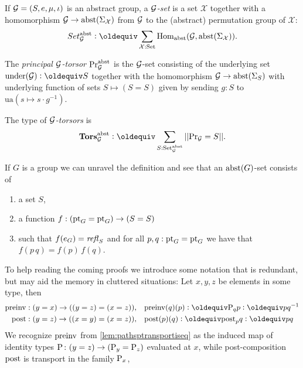 \begin{definition}
\label{def:abstrGtorsors}
  If ${\mathcal G}=(S,e,\mu,\iota)$ is an abstract group, a \emph{$\mathcal G$-set} is a set $\mathcal X$ together with a homomorphism
$\mathcal G\to\mathrm{abst}(\Sigma_{\mathcal X})$
from $\mathcal G$ to the (abstract) permutation group of $\mathcal X$:
$$Set_{\agp G}^\abstr\defequi \sum_{\mathcal X:\Set}\Hom_\abstr({\agp G},\abstr(\Sigma_{\mathcal X})).$$

The \emph{principal ${\mathcal G}$-torsor} $\mathrm{Pr}_{{\mathcal G}}^{\mathrm{abst}}$ is the ${\mathcal G}$-set consisting of the underlying set $\mathrm{under}({\agp G})\defequi S$ together with the homomorphism ${\mathcal G}\to\mathrm{abst}(\Sigma_{S})$ with underlying function of sets $S\mapsto (S=S)$ given by sending $g:S$ to $\mathrm{ua}(s\mapsto s\cdot g^{-1})$.

The type of \emph{${\mathcal G}$-torsors} is
$$\typetorsor_{\agp G}^\abstr\defequi\sum_{S:\Set_{\agp G}^\abstr}||\princ {\agp G}=S||.$$
\end{definition}
\begin{example}
  If $G$ is a group we can unravel the definition and see that an $\mathrm{abst}(G)$-set consists of
  \begin{enumerate}
  \item a set $S$, 
  \item a function $f:({\mathord{\mathrm{pt}}}_G={\mathord{\mathrm{pt}}}_G)\to (S=S)$ 
  \item such that $f(e_G)=\mathop{{\it refl}_{S}}$ and for all $p,q:{\mathord{\mathrm{pt}}}_G={\mathord{\mathrm{pt}}}_G$ we have that $f(p\, q)=f(p)\,f(q)$.
  \end{enumerate}

\end{example}


To help reading the coming proofs we introduce some notation that is redundant, but may aid the memory in cluttered situations:  Let $x,y,z$ be elements in some type, then
\begin{align*}
  \preinv:(y=x)\to ((y=z)=(x=z)),\quad&\preinv(q)(p)\defequi\pathsp qp\defequi pq^{-1}\\
  \post:(y=z)\to ((x=y)=(x=z)),\quad&\post(p)(q)\defequi\post_pq\defequi pq\\
\end{align*}
We recognize $\mathrm{preinv}$ from \cref{lem:pathsptransportiseq} as the induced map of identity types $\mathrm{P}_{}\colon (y=z)\to(\mathrm{P}_{y}=\mathrm{P}_{z})$ evaluated at $x$, while post-composition $\mathrm{post}$ is transport in the family $\mathrm{P}_{x}$, 


